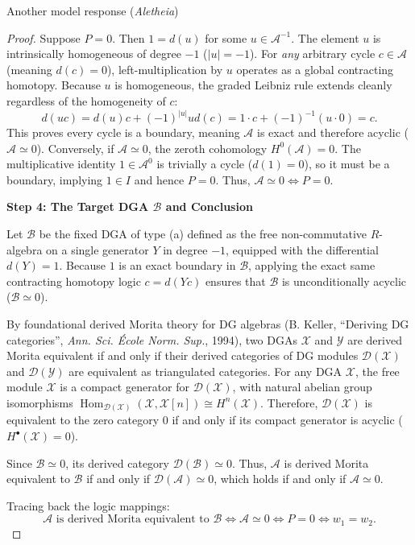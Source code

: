 \documentclass{article}
\theoremstyle{plain}
\theoremstyle{definition}
\begin{document}
\begin{solution}{Another model response (\emph{Aletheia})}
\begin{proof}
Suppose $P = 0$. Then $1 = d(u)$ for some $u \in \mathcal{A}^{-1}$. The element $u$ is intrinsically homogeneous of degree $-1$ ($|u| = -1$). For \textit{any} arbitrary cycle $c \in \mathcal{A}$ (meaning $d(c) = 0$), left-multiplication by $u$ operates as a global contracting homotopy. Because $u$ is homogeneous, the graded Leibniz rule extends cleanly regardless of the homogeneity of $c$:
\[
    d(u c) = d(u)c + (-1)^{|u|}u d(c) = 1 \cdot c + (-1)^{-1}(u \cdot 0) = c.
\]
This proves every cycle is a boundary, meaning $\mathcal{A}$ is exact and therefore acyclic ($\mathcal{A} \simeq 0$).
Conversely, if $\mathcal{A} \simeq 0$, the zeroth cohomology $H^0(\mathcal{A}) = 0$. The multiplicative identity $1 \in \mathcal{A}^0$ is trivially a cycle ($d(1) = 0$), so it must be a boundary, implying $1 \in I$ and hence $P = 0$. Thus, $\mathcal{A} \simeq 0 \iff P = 0$.

\textbf{Step 4: The Target DGA $\mathcal{B}$ and Conclusion}

Let $\mathcal{B}$ be the fixed DGA of type (a) defined as the free non-commutative $R$-algebra on a single generator $Y$ in degree $-1$, equipped with the differential $d(Y) = 1$. Because $1$ is an exact boundary in $\mathcal{B}$, applying the exact same contracting homotopy logic $c = d(Yc)$ ensures that $\mathcal{B}$ is unconditionally acyclic ($\mathcal{B} \simeq 0$).

By foundational derived Morita theory for DG algebras (B. Keller, ``Deriving DG categories'', \textit{Ann. Sci. École Norm. Sup.}, 1994), two DGAs $\mathcal{X}$ and $\mathcal{Y}$ are derived Morita equivalent if and only if their derived categories of DG modules $\mathcal{D}(\mathcal{X})$ and $\mathcal{D}(\mathcal{Y})$ are equivalent as triangulated categories. For any DGA $\mathcal{X}$, the free module $\mathcal{X}$ is a compact generator for $\mathcal{D}(\mathcal{X})$, with natural abelian group isomorphisms $\operatorname{Hom}_{\mathcal{D}(\mathcal{X})}(\mathcal{X}, \mathcal{X}[n]) \cong H^n(\mathcal{X})$. Therefore, $\mathcal{D}(\mathcal{X})$ is equivalent to the zero category $0$ if and only if its compact generator is acyclic ($H^\bullet(\mathcal{X})=0$).

Since $\mathcal{B} \simeq 0$, its derived category $\mathcal{D}(\mathcal{B}) \simeq 0$. Thus, $\mathcal{A}$ is derived Morita equivalent to $\mathcal{B}$ if and only if $\mathcal{D}(\mathcal{A}) \simeq 0$, which holds if and only if $\mathcal{A} \simeq 0$.

Tracing back the logic mappings:
\[
    \mathcal{A} \text{ is derived Morita equivalent to } \mathcal{B} \iff \mathcal{A} \simeq 0 \iff P = 0 \iff w_1 = w_2.
\]


\end{proof}
\end{solution}
\end{document}
